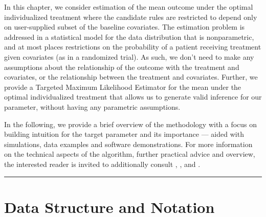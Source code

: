 \documentclass[
  12pt, krantz2,
]{krantz}
\newcommand{\1}{\mathbbm{1}}
\theoremstyle{definition}
\theoremstyle{definition}
\theoremstyle{definition}
\theoremstyle{definition}
\theoremstyle{remark}
\begin{document}
In this chapter, we consider estimation of the mean outcome under the optimal
individualized treatment where the candidate rules are restricted to depend only
on user-supplied subset of the baseline covariates. The estimation problem is
addressed in a statistical model for the data distribution that is
nonparametric, and at most places restrictions on the probability of a patient
receiving treatment given covariates (as in a randomized trial). As such, we
don't need to make any assumptions about the relationship of the outcome with
the treatment and covariates, or the relationship between the treatment and
covariates. Further, we provide a Targeted Maximum Likelihood Estimator for the
mean under the optimal individualized treatment that allows us to generate valid
inference for our parameter, without having any parametric assumptions.

In the following, we provide a brief overview of the methodology with a focus on
building intuition for the target parameter and its importance --- aided with simulations,
data examples and software demonstrations. For more information on the technical aspects
of the algorithm, further practical advice and overview, the interested reader is invited to
additionally consult \citet{vanderLaanLuedtke15}, \citet{luedtke2016super}, \citet{montoya2021optimal} and
\citet{montoya2021performance}.

\begin{center}\rule{0.5\linewidth}{0.5pt}\end{center}

\hypertarget{data-structure-and-notation}{%
\section{Data Structure and Notation}\label{data-structure-and-notation}}
\end{document}

